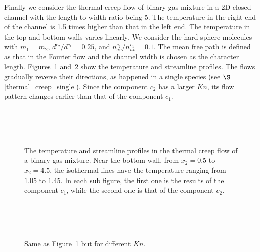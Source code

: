Finally we consider the thermal creep flow of binary gas mixture in a 2D closed channel  with the length-to-width ratio being 5. The temperature in the right end of the channel is 1.5 times higher than that in the left end. The temperature in the top and bottom walls varies linearly. We consider the hard sphere molecules with $m_1=m_2$, $d^{c_2}/d^{c_1}=0.25$, and $n_{av}^{c_2}/n_{av}^{c_1}=0.1$. The mean free path is defined as that in the Fourier flow and the channel width is chosen as the character length. Figures~\ref{binary_thermal1} and~\ref{binary_thermal2} show the temperature and streamline profiles. The flows gradually reverse their directions, as happened in a single species (see $\S$\ref{thermal_creep_single}). Since the component $c_2$ has a larger $Kn$, its flow pattern changes earlier than that of the component $c_1$. 


\begin{figure}[tbp]
  \centering
   \\
       \\
     \\
     \caption[The temperature and streamline profiles in the thermal creep flow of a binary gas mixture.]{The temperature and streamline profiles in the thermal creep flow of a binary gas mixture. Near the bottom wall, from $x_2=0.5$ to $x_2=4.5$, the isothermal lines have the temperature ranging from $1.05$ to $1.45$. In each sub figure, the first one is the results of the component $c_1$, while the second one is that of the component $c_2$.}
     \label{binary_thermal1}
\end{figure}


\begin{figure}[tbp]
  \centering
   \\
  \\
\\
     \caption[The temperature and streamline profiles in the thermal creep flow of a binary gas mixture (continued).]{Same as Figure~\ref{binary_thermal1} but for different $Kn$.}
     \label{binary_thermal2}
\end{figure}



